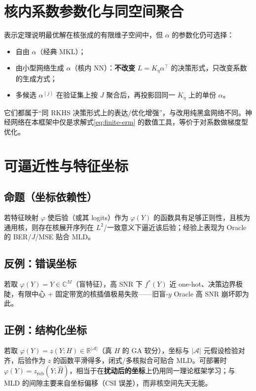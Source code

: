 \section{核内系数参数化与同空间聚合}

表示定理说明最优解在核张成的有限维子空间中，但 $\alpha$ 的参数化仍可选择：
\begin{itemize}[leftmargin=2em]
  \item 自由 $\alpha$（经典 MKL）；
  \item 由小型网络生成 $\alpha$（核内 NN）：\textbf{不改变} $L=K_\eta\alpha^\top$ 的决策形式，只改变系数的生成方式；
  \item 多候选 $\alpha^{(j)}$ 在验证集上按 $J$ 聚合后，再投影回同一 $K_\eta$ 上的单份 $\alpha$。
\end{itemize}
它们都属于“同 RKHS 决策形式上的表达/优化增强”，与改用纯黑盒网络不同。神经网络在本框架中仅是求解式\eqref{eq:finite-erm} 的数值工具，等价于对系数做梯度型优化。

\section{可逼近性与特征坐标}
\label{sec:coord}

\subsection{命题（坐标依赖性）}
若特征映射 $\varphi$ 使后验（或其 logits）作为 $\varphi(Y)$ 的函数具有足够正则性，且核为通用核，则存在核展开序列在 $L^2$/一致意义下逼近该后验；经验上表现为 Oracle 的 BER/$J$/MSE 贴合 MLD。

\subsection{反例：错误坐标}
若取 $\varphi(Y)=Y\in\mathbb{C}^{M}$（盲特征），高 SNR 下 $f^*(Y)$ 近 one-hot、决策边界极陡，有限中心 + 固定带宽的核插值极易失败——旧盲-$y$ Oracle 高 SNR 崩坏即为此。

\subsection{正例：结构化坐标}
若取 $\varphi(Y)=z(Y;H)\in\mathbb{R}^{|\mathcal{A}|}$（真 $H$ 的 GA 软分），坐标与 $|\mathcal{A}|$ 元假设检验对齐，后验作为 $z$ 的函数平滑得多，闭式/多核拟合可贴合 MLD。可部署时 $\varphi(Y)=z_{\mathrm{rob}}(Y;\hat H)$，相当于在\textbf{扰动后的坐标}上仍用同一理论框架学习；与 MLD 的间隙主要来自坐标偏移（CSI 误差），而非核空间先天无能。

